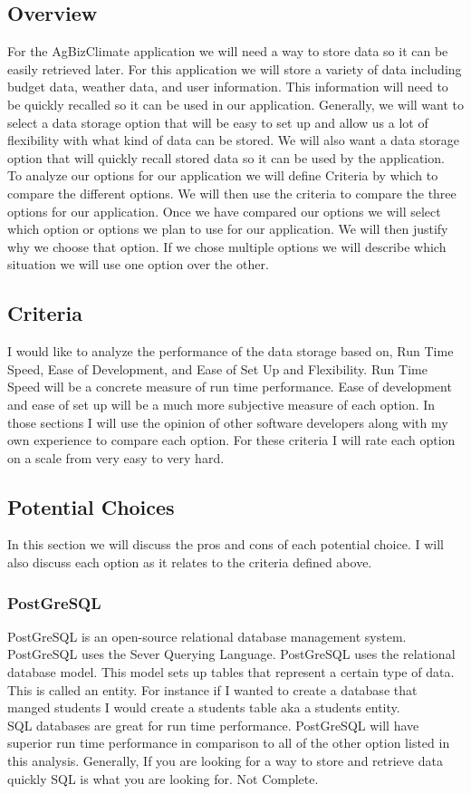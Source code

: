 \documentclass[letterpaper,10pt]{article}
\begin{document}
	\subsection{Overview}
		For the AgBizClimate application we will need a way to store data so it can be easily retrieved later. For this application we will store a variety of data including budget data, weather data, and user information. This information will need to be quickly recalled so it can be used in our application. Generally, we will want to select a data storage option that will be easy to set up and allow us a lot of flexibility with what kind of data can be stored. We will also want a data storage option that will quickly recall stored data so it can be used by the application.\\
		To analyze our options for our application we will define Criteria by which to compare the different options. We will then use the criteria to compare the three options for our application. Once we have compared our options we will select which option or options we plan to use for our application. We will then justify why we choose that option. If we chose multiple options we will describe which situation we will use one option over the other.
	\subsection{Criteria}
		I would like to analyze the performance of the data storage based on, Run Time Speed, Ease of Development, and Ease of Set Up and Flexibility. Run Time Speed will be a concrete measure of run time performance. Ease of development and ease of set up will be a much more subjective measure of each option. In those sections I will use the opinion of other software developers along with my own experience to compare each option. For these criteria I will rate each option on a scale from very easy to very hard.
	\subsection{Potential Choices}
		In this section we will discuss the pros and cons of each potential choice. I will also discuss each option as it relates to the criteria defined above. 
		\subsubsection{PostGreSQL}
				PostGreSQL is an open-source relational database management system. PostGreSQL uses the Sever Querying Language. PostGreSQL uses the relational database model. This model sets up tables that represent a certain type of data. This is called an entity. For instance if I wanted to create a database that manged students I would create a students table aka a students entity.\\
				SQL databases are great for run time performance. PostGreSQL will have superior run time performance in comparison to all of the other option listed in this analysis. Generally, If you are looking for a way to store and retrieve data quickly SQL is what you are looking for.
				Not Complete.
				
\end{document}
